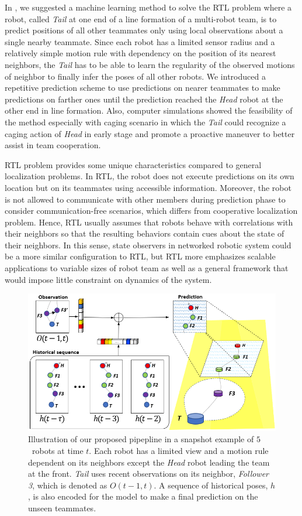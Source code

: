 \documentclass[letterpaper, 10 pt, conference]{ieeeconf}  %
\begin{document}
	In \cite{CPR17}, we suggested a machine learning method to solve the
	RTL problem where a robot, called \emph{Tail} at one end of a line formation of
	a multi-robot team, is to predict positions of all other teammates only using local
	observations about a single nearby teammate. Since each robot has a limited sensor
	radius and a relatively simple motion rule with dependency
	on the position of its nearest neighbors,
	the \emph{Tail} has to be able to learn the regularity
	of the observed motions of neighbor to finally infer the poses of all other robots.
	We introduced a repetitive prediction scheme to use predictions on
	nearer teammates to make predictions on farther ones until the prediction
	reached the \emph{Head} robot at the other end in line formation.
	Also, computer simulations showed the feasibility of the method
	especially with caging scenario in which the \emph{Tail} could recognize a
	caging action of \emph{Head} in early stage and promote a proactive maneuver to
	better assist in team cooperation.

	RTL problem provides some unique characteristics compared to general localization problems.
	In RTL, the robot does not execute predictions on its own location but on
	its teammates using accessible information.
	Moreover, the robot is not allowed to communicate with other members during
	prediction phase to consider communication-free scenarios, which differs from
	cooperative localization problem.
	Hence, RTL usually assumes that robots behave with correlations with their neighbors
	so that the resulting behaviors contain cues about the state of their neighbors.
	In this sense, state observers in networked robotic system could be a more similar
	configuration to RTL, but RTL more emphasizes
	scalable applications to variable sizes of robot team as well as a general framework
	that would impose little constraint on dynamics of the system.

	\begin{figure}\centering
		\includegraphics[width=1.\columnwidth]{fig_Concept}
		\caption{Illustration of our proposed pipepline in a snapshot example of
			$5$~robots at time $t$.
			Each robot has a limited view and a motion rule dependent on its neighbors
			except the \emph{Head} robot leading the team at the front.
			\emph{Tail} uses recent observations on its neighbor, \emph{Follower 3},
			which is denoted as $O(t-1,t)$. A sequence of historical poses, $h$, is
			also encoded for the model to make a final prediction on the
			unseen teammates.
		}
		\label{fig:Concept}
	\end{figure}
\end{document}
